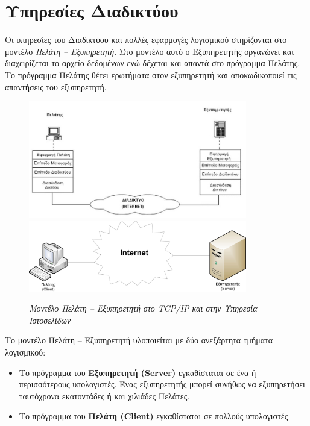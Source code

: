 %
%
\section{Υπηρεσίες Διαδικτύου}

Οι υπηρεσίες του Διαδικτύου και πολλές εφαρμογές λογισμικού στηρίζονται στο μοντέλο \emph{Πελάτη -- Εξυπηρετητή}. Στο μοντέλο αυτό ο Εξυπηρετητής οργανώνει και διαχειρίζεται το αρχείο δεδομένων ενώ δέχεται και απαντά στο πρόγραμμα Πελάτης. Το πρόγραμμα Πελάτης θέτει ερωτήματα στον εξυπηρετητή και αποκωδικοποιεί τις απαντήσεις του εξυπηρετητή. 

 \begin{figure}[!ht]
  \centering
  \includegraphics[width=0.85\textwidth]{images/chapter6/6-5}
  \includegraphics[width=0.85\textwidth]{images/chapter6/6-6}
  \caption {\textsl{Μοντέλο Πελάτη -- Εξυπηρετητή στο TCP/IP και στην Υπηρεσία Ιστοσελίδων }}
  \label{6-5}
\end{figure}

Το μοντέλο Πελάτη -- Εξυπηρετητή υλοποιείται με δύο ανεξάρτητα τμήματα λογισμικού:

\begin{itemize}
\item Το πρόγραμμα του \textbf{Εξυπηρετητή (Server)} εγκαθίσταται σε ένα ή περισσότερους υπολογιστές. Ένας εξυπηρετητής μπορεί συνήθως να εξυπηρετήσει ταυτόχρονα εκατοντάδες ή και χιλιάδες Πελάτες.
\item Το πρόγραμμα του \textbf{Πελάτη (Client)} εγκαθίσταται σε πολλούς υπολογιστές
\end{itemize}


